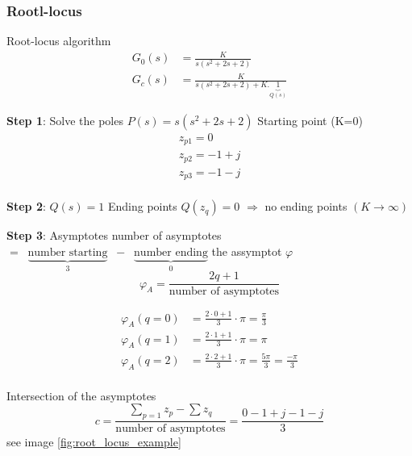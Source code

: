 \subsubsection{Rootl-locus}

\begin{exampleblock}{Root-locus algorithm}
    \begin{align*}
        G_0(s) &= \frac{K}{s(s^2 + 2s + 2)} \\
        G_c(s) &= \frac{K}{s(s^2 + 2s + 2) + K.\underbrace{1}_{Q(s)} }
    \end{align*}

    \textbf{Step 1}: Solve the poles $P(s) = s(s^2 + 2s + 2)$
    Starting point (K=0)
    \begin{align*}
        z_{p1} = 0 \\
        z_{p2} = -1+j \\
        z_{p3} = -1-j \\
    \end{align*}

    \textbf{Step 2}: $Q(s) = 1$ 
    Ending points $Q(z_q) = 0$ $\Rightarrow$ no ending points $(K\to\infty)$

    \textbf{Step 3}: Asymptotes
    number of asymptotes $= \;\; \underbrace{\text{number starting}}_{3} \;\; - \;\; \underbrace{\text{number ending}}_{0}$
    the assymptot $\varphi$ 
    \begin{equation*}
        \varphi_A = \frac{2q + 1}{\text{number of asymptotes}}
    \end{equation*}

    \begin{align*}
        \varphi_A(q=0) &= \frac{2\cdot 0 + 1}{3}\cdot\pi = \frac{\pi}{3} \\
        \varphi_A(q=1) &= \frac{2\cdot 1 + 1}{3}\cdot\pi = \pi \\
        \varphi_A(q=2) &= \frac{2\cdot 2 + 1}{3}\cdot\pi = \frac{5\pi}{3} = \frac{-\pi}{3} \\
    \end{align*}

    Intersection of the asymptotes
    \begin{equation*}
        c = \frac{\sum_{p=1} z_p - \sum z_q}{\text{number of asymptotes}} 
        = \frac{0-1+j-1-j}{3}
    \end{equation*}
    see image \ref{fig:root_locus_example}


\end{exampleblock}
